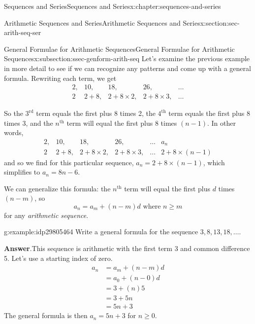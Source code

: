 \documentclass[twoside,10pt,]{book}
\newcommand{\blocktitlefont}{\relax}
\numberwithin{equation}{section}
\newcommand{\nth}{{n^{\text{th}}}}
\newcommand{\upth}[1]{{#1^{\text{th}}}}
\newcommand{\uprd}[1]{{#1^{\text{rd}}}}
\newcommand{\amp}{&}
\begin{document}
\begin{chapterptx}{Sequences and Series}{}{Sequences and Series}{}{}{x:chapter:sequences-and-series}
\begin{sectionptx}{Arithmetic Sequences and Series}{}{Arithmetic Sequences and Series}{}{}{x:section:sec-arith-seq-ser}
\begin{subsectionptx}{General Formulae for Arithmetic Sequences}{}{General Formulae for Arithmetic Sequences}{}{}{x:subsection:ssec-genform-arith-seq}
Let's examine the previous example in more detail to see if we can recognize any patterns and come up with a general formula.  Rewriting each term, we get%
\begin{equation*}
\begin{array}{*{20}{c}}
{2,}\amp{10,}\amp{18,}\amp{26,}\amp{\ldots}\\
2\amp{2 + 8,}\amp{2 + 8\times 2,}\amp{2 + 8\times 3,}\amp{\ldots}
\end{array}
\end{equation*}
%
\par
So the \(\uprd{3}\) term equals the first plus 8 times 2, the \(\upth{4}\) term equals the first plus 8 times 3, and the \(\nth{}\) term will equal the first plus 8 times \((n - 1)\).   In other words,%
\begin{equation*}
\begin{array}{*{20}{c}}
{2,}\amp{10,}\amp{18,}\amp{26,}\amp{\ldots}\amp{a_n}\\
2\amp{2 + 8,}\amp{2 + 8 \times 2,}\amp{2 + 8 \times 3,}\amp{\ldots}\amp{2+8 \times (n-1)}
\end{array}
\end{equation*}
and so we find for this particular sequence, \(a_n=2+8 \times (n-1)\), which simplifies to \(a_n=8n-6\).%
\par
We can generalize this formula: the \(\nth{}\) term will equal the first plus \(d\) times \((n - m)\), so%
\begin{equation*}
a_n = a_m + \left( n - m \right)d \text{   where } n \ge m
\end{equation*}
for any \emph{arithmetic sequence}. \begin{example}{}{g:example:idp29805464}%
Write a general formula for the sequence \(3, 8, 13, 18, \ldots\).\par\smallskip%
\noindent\textbf{\blocktitlefont Answer}.\label{g:answer:idp29803160}{}\hypertarget{g:answer:idp29803160}{}\quad{}This sequence is arithmetic with the first term 3 and common difference 5.  Let's use a starting index of zero.%
\begin{align*}
a_n \amp = a_m + \left( n - m \right)d\\
\amp = {a_0} + \left( {n - 0} \right)d\\
\amp = 3 + \left( {n} \right)5\\
\amp = 3 + 5n\\
\amp = 5n + 3
\end{align*}
The general formula is then \(a_n = 5n + 3\) for \(n \ge 0\).\end{example}

\end{subsectionptx}
\end{sectionptx}
\end{chapterptx}
\end{document}

